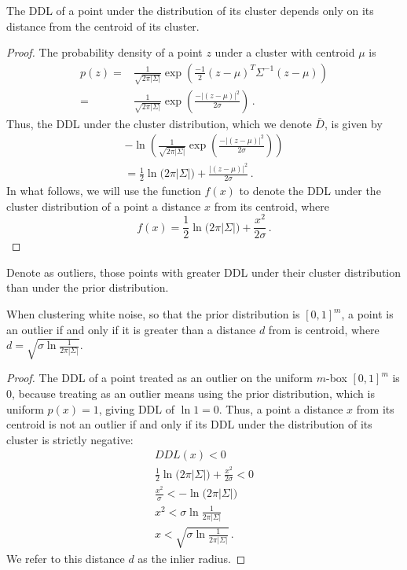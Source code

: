 \begin{proposition} \label{proposition:fx}
The DDL of a point under the distribution of its cluster depends only on its distance from the centroid of its cluster.
\end{proposition}
\begin{proof}

The probability density of a point $z$ under a cluster with centroid $\mu$ is
\begin{align*}
p(z)    =& \frac{1}{\sqrt{2\pi |\Sigma|}}\exp{\left(\frac{-1}{2}(z-\mu)^T\Sigma^{-1}(z-\mu)\right)} \\
        =& \frac{1}{\sqrt{2\pi |\Sigma|}}\exp{\left(\frac{-|(z-\mu)|^2}{2\sigma}\right)} \,.
\end{align*}
Thus, the DDL under the cluster distribution, which we denote $\bar{D}$, is given by
\begin{gather*}
 -\ln{\left(\frac{1}{\sqrt{2\pi |\Sigma|}}\exp{\left(\frac{-|(z-\mu)|^2}{2\sigma}\right)}\right)} \\
        = \frac{1}{2} \ln{(2\pi |\Sigma|}) + \frac{|(z-\mu)|^2}{2\sigma} \,.
\end{gather*}
In what follows, we will use the function $f(x)$ to denote the DDL under the cluster distribution of a point a distance $x$ from its centroid, where
\[
f(x) = \frac{1}{2} \ln{(2\pi |\Sigma|}) + \frac{x^2}{2\sigma} \,.
\]
\end{proof}

\begin{definition}
Denote as outliers, those points with greater DDL under their cluster distribution than under the prior distribution.
\end{definition}
 
\begin{lemma} \label{lemma:d}
When clustering white noise, so that the prior distribution is $[0,1]^m$, a point is an outlier if and only if it is greater than a distance $d$ from is centroid, where $d=\sqrt{\sigma \ln{\frac{1}{2\pi |\Sigma|}}}$.
\end{lemma}
\begin{proof}
The DDL of a point treated as an outlier on the uniform $m$-box $[0,1]^m$ is 0, because treating as an outlier means using the prior distribution, which is uniform $p(x)=1$, giving DDL of $\ln{1} = 0$. Thus, a point a distance $x$ from its centroid is not an outlier if and only if its DDL under the distribution of its cluster is strictly negative:
\begin{gather*}
    DDL(x) < 0 \\
    \frac{1}{2} \ln{(2\pi |\Sigma|}) + \frac{x^2}{2\sigma} < 0 \\
    \frac{x^2}{\sigma} < -\ln{(2\pi |\Sigma|}) \\
    x^2 < \sigma \ln{\frac{1}{2\pi |\Sigma|}} \\
    x < \sqrt{\sigma \ln{\frac{1}{2\pi |\Sigma|}}} \,.
\end{gather*}
We refer to this distance $d$ as the inlier radius.
\end{proof}

